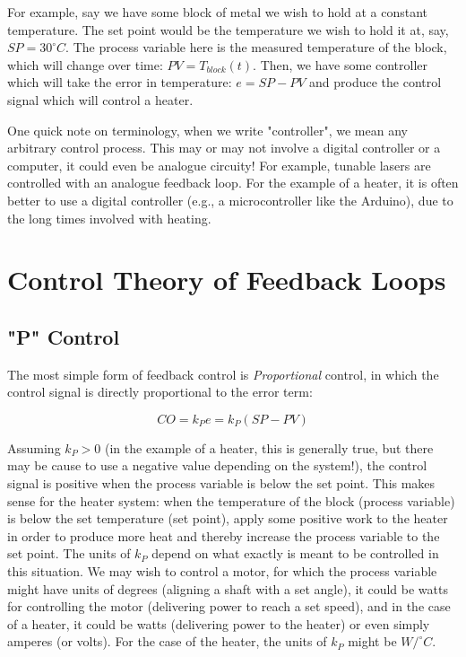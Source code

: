 \documentclass[11pt, letterpaper]{article}
\begin{document}
For example, say we have some block of metal we wish to hold at a constant temperature. The set point would be the temperature we wish to hold it at, say, $SP=30^{\circ} C$. The process variable here is the measured temperature of the block, which will change over time: $PV=T_{block}(t)$. Then, we have some controller which will take the error in temperature: $e=SP-PV$ and produce the control signal which will control a heater. 

One quick note on terminology, when we write "controller", we mean any arbitrary control process. This may or may not involve a digital controller or a computer, it could even be analogue circuity! For example, tunable lasers are controlled with an analogue feedback loop. For the example of a heater, it is often better to use a digital controller (e.g., a microcontroller like the Arduino), due to the long times involved with heating. 

\section{Control Theory of Feedback Loops}
\subsection{"P" Control}
The most simple form of feedback control is {\it Proportional} control, in which the control signal  is directly proportional to the error term:

$$ CO = k_P e = k_P ( SP-PV) $$

Assuming $k_P>0$ (in the example of a heater, this is generally true, but there may be cause to use a negative value depending on the system!), the control signal is positive when the process variable is below the set point. This makes sense for the heater system: when the temperature of the block (process variable) is below the set temperature (set point), apply some positive work to the heater in order to produce more heat and thereby increase the process variable to the set point. The units of $k_P$ depend on what exactly is meant to be controlled in this situation. We may wish to control a motor, for which the process variable might have units of degrees (aligning a shaft with a set angle), it could be watts for controlling the motor (delivering power to reach a set speed), and in the case of a heater, it could be watts (delivering power to the heater) or even simply amperes (or volts). For the case of the heater, the units of $k_P$ might be $W/^{\circ} C$.
\end{document}
